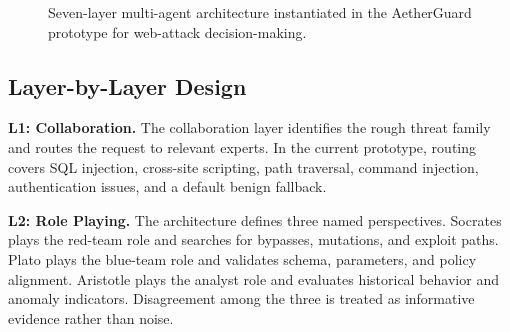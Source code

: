 \documentclass{ieeeaccess}
\newcommand{\sys}{AetherGuard}
\begin{document}
\begin{figure}[!t]
\centering
{}
\caption{Seven-layer multi-agent architecture instantiated in the \sys{} prototype for web-attack decision-making.}
\label{fig:architecture}
\end{figure}

\subsection{Layer-by-Layer Design}
\textbf{L1: Collaboration.} The collaboration layer identifies the rough threat family and routes the request to relevant experts. In the current prototype, routing covers SQL injection, cross-site scripting, path traversal, command injection, authentication issues, and a default benign fallback.

\textbf{L2: Role Playing.} The architecture defines three named perspectives. Socrates plays the red-team role and searches for bypasses, mutations, and exploit paths. Plato plays the blue-team role and validates schema, parameters, and policy alignment. Aristotle plays the analyst role and evaluates historical behavior and anomaly indicators. Disagreement among the three is treated as informative evidence rather than noise.
\end{document}

